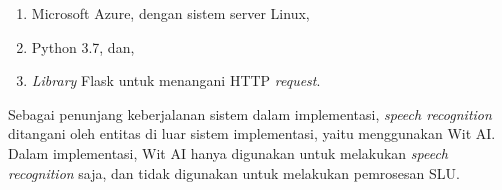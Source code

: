\begin{enumerate}
    \item Microsoft Azure, dengan sistem server Linux,
    \item Python 3.7, dan,
    \item \textit{Library} Flask untuk menangani HTTP \textit{request}.
\end{enumerate}

Sebagai penunjang keberjalanan sistem dalam implementasi, \textit{speech recognition} ditangani oleh entitas di luar sistem implementasi, yaitu menggunakan Wit AI. Dalam implementasi, Wit AI hanya digunakan untuk melakukan \textit{speech recognition} saja, dan tidak digunakan untuk melakukan pemrosesan SLU.